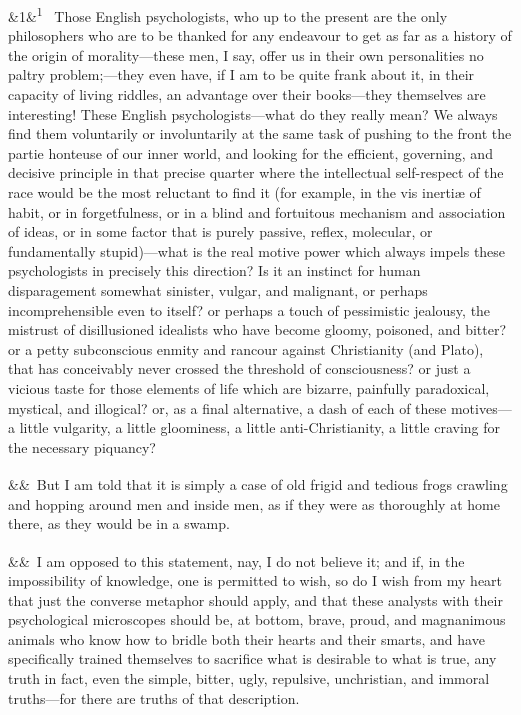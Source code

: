 \documentclass[12pt]{article}
\newcommand{\para}[1][]{\par\noindent\ifx&#1&\else\textsuperscript{\footnotesize #1}~\fi}
\begin{document}
\para[1] Those English psychologists, who up to the present are the only philosophers who are to be thanked for any endeavour to get as far as a history of the origin of morality---these men, I say, offer us in their own personalities no paltry problem;---they even have, if I am to be quite frank about it, in their capacity of living riddles, an advantage over their books---they themselves are interesting! These English psychologists---what do they really mean? We always find them voluntarily or involuntarily at the same task of pushing to the front the partie honteuse of our inner world, and looking for the efficient, governing, and decisive principle in that precise quarter where the intellectual self-respect of the race would be the most reluctant to find it (for example, in the vis inertiæ of habit, or in forgetfulness, or in a blind and fortuitous mechanism and association of ideas, or in some factor that is purely passive, reflex, molecular, or fundamentally stupid)---what is the real motive power which always impels these psychologists in precisely this direction? Is it an instinct for human disparagement somewhat sinister, vulgar, and malignant, or perhaps incomprehensible even to itself? or perhaps a touch of pessimistic jealousy, the mistrust of disillusioned idealists who have become gloomy, poisoned, and bitter? or a petty subconscious enmity and rancour against Christianity (and Plato), that has conceivably never crossed the threshold of consciousness? or just a vicious taste for those elements of life which are bizarre, painfully paradoxical, mystical, and illogical? or, as a final alternative, a dash of each of these motives---a little vulgarity, a little gloominess, a little anti-Christianity, a little craving for the necessary piquancy?

\para But I am told that it is simply a case of old frigid and tedious frogs crawling and hopping around men and inside men, as if they were as thoroughly at home there, as they would be in a swamp.

\para I am opposed to this statement, nay, I do not believe it; and if, in the impossibility of knowledge, one is permitted to wish, so do I wish from my heart that just the converse metaphor should apply, and that these analysts with their psychological microscopes should be, at bottom, brave, proud, and magnanimous animals who know how to bridle both their hearts and their smarts, and have specifically trained themselves to sacrifice what is desirable to what is true, any truth in fact, even the simple, bitter, ugly, repulsive, unchristian, and immoral truths---for there are truths of that description.
\end{document}
